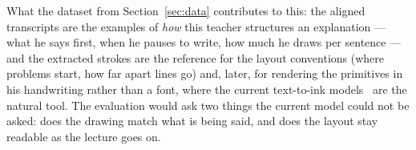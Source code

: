 \documentclass[11pt]{article}
\begin{document}
What the dataset from Section~\ref{sec:data} contributes to this: the aligned transcripts are the examples of \emph{how} this teacher structures an explanation --- what he says first, when he pauses to write, how much he draws per sentence --- and the extracted strokes are the reference for the layout conventions (where problems start, how far apart lines go) and, later, for rendering the primitives in his handwriting rather than a font, where the current text-to-ink models~\citep{pan2026diffink} are the natural tool. The evaluation would ask two things the current model could not be asked: does the drawing match what is being said, and does the layout stay readable as the lecture goes on.

\vspace{1em}



\end{document}
